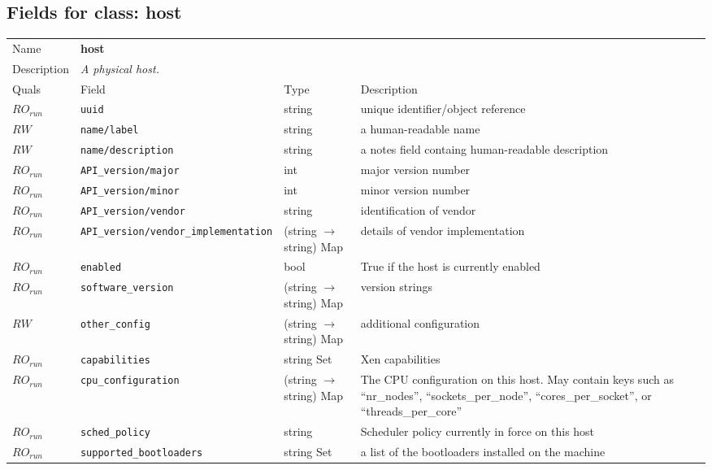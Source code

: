 \subsection{Fields for class: host}
\begin{longtable}{|lllp{}|}
\hline
\multicolumn{1}{|l}{Name} & \multicolumn{3}{l|}{\bf host} \\
\multicolumn{1}{|l}{Description} & \multicolumn{3}{l|}{\parbox{11cm}{\em A
physical host.}} \\
\hline
Quals & Field & Type & Description \\
\hline
$\mathit{RO}_\mathit{run}$ &  {\tt uuid} & string & unique identifier/object reference \\
$\mathit{RW}$ &  {\tt name/label} & string & a human-readable name \\
$\mathit{RW}$ &  {\tt name/description} & string & a notes field containg human-readable description \\
$\mathit{RO}_\mathit{run}$ &  {\tt API\_version/major} & int & major version number \\
$\mathit{RO}_\mathit{run}$ &  {\tt API\_version/minor} & int & minor version number \\
$\mathit{RO}_\mathit{run}$ &  {\tt API\_version/vendor} & string & identification of vendor \\
$\mathit{RO}_\mathit{run}$ &  {\tt API\_version/vendor\_implementation} & (string $\rightarrow$ string) Map & details of vendor implementation \\
$\mathit{RO}_\mathit{run}$ &  {\tt enabled} & bool & True if the host is currently enabled \\
$\mathit{RO}_\mathit{run}$ &  {\tt software\_version} & (string $\rightarrow$ string) Map & version strings \\
$\mathit{RW}$ &  {\tt other\_config} & (string $\rightarrow$ string) Map & additional configuration \\
$\mathit{RO}_\mathit{run}$ &  {\tt capabilities} & string Set & Xen capabilities \\
$\mathit{RO}_\mathit{run}$ &  {\tt cpu\_configuration} & (string $\rightarrow$ string) Map & The CPU configuration on this host.  May contain keys such as ``nr\_nodes'', ``sockets\_per\_node'', ``cores\_per\_socket'', or ``threads\_per\_core'' \\
$\mathit{RO}_\mathit{run}$ &  {\tt sched\_policy} & string & Scheduler policy currently in force on this host \\
$\mathit{RO}_\mathit{run}$ &  {\tt supported\_bootloaders} & string Set & a list of the bootloaders installed on the machine \\

\end{longtable}
